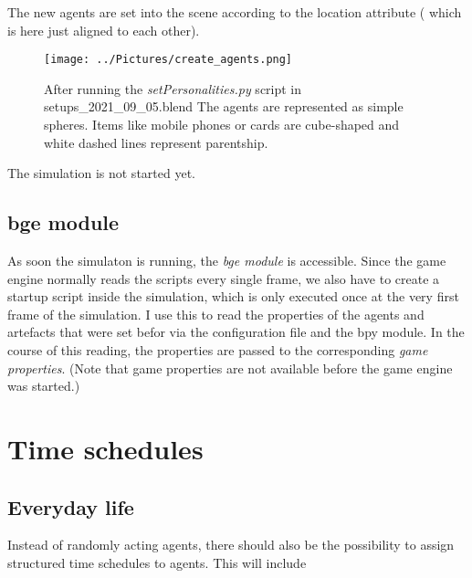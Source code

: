 \documentclass[11pt,a4paper]{article}
\begin{document}
The new agents are set into the scene according to the location attribute ( which is here just aligned to each other). 
\begin{figure}
\centering
\texttt{[image: ../Pictures/create\_agents.png]} %
\caption{After running the \textit{setPersonalities.py} script in setups\_2021\_09\_05.blend The agents are represented as simple spheres. Items like mobile phones or cards are cube-shaped and white dashed lines represent parentship.}
\end{figure}
 
The simulation is not started yet.

\subsection{bge module}
As soon the simulaton is running, the \textit{bge module} is accessible. Since the game engine normally reads the scripts every single frame, we also have to create a startup script inside the simulation, which is only executed once at the very first frame of the simulation. I use this to read the properties of the agents and artefacts that were set befor via the configuration file and the bpy module. In the course of this reading, the properties are passed to the corresponding \textit{game properties}. (Note that game properties are not available before the game engine was started.) 

\section{Time schedules}
\subsection{Everyday life}
Instead of randomly acting agents, there should also be the possibility to assign structured time schedules to agents. This will include \\
\end{document}
